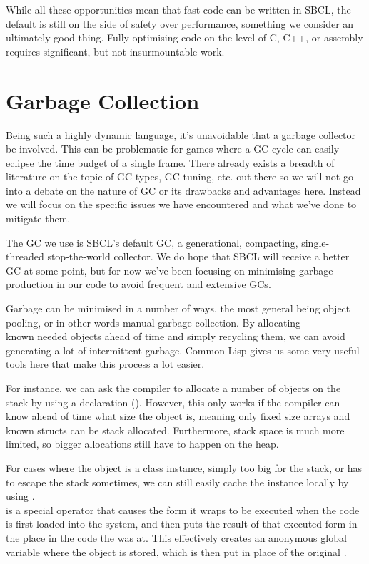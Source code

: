 \documentclass[a4paper]{paper}
\begin{document}
While all these opportunities mean that fast code can be written in SBCL, the default is still on the side of safety over performance, something we consider an ultimately good thing. Fully optimising code on the level of C, C++, or assembly requires significant, but not insurmountable work.

\section{Garbage Collection}
Being such a highly dynamic language, it's unavoidable that a garbage collector be involved. This can be problematic for games where a GC cycle can easily eclipse the time budget of a single frame. There already exists a breadth of literature on the topic of GC types, GC tuning, etc. out there so we will not go into a debate on the nature of GC or its drawbacks and advantages here. Instead we will focus on the specific issues we have encountered and what we've done to mitigate them.

The GC we use is SBCL's default GC, a generational, compacting, single-threaded stop-the-world collector. We do hope that SBCL will receive a better GC at some point, but for now we've been focusing on minimising garbage production in our code to avoid frequent and extensive GCs.

Garbage can be minimised in a number of ways, the most general being object pooling, or in other words manual garbage collection. By allocating\\known needed objects ahead of time and simply recycling them, we can avoid generating a lot of intermittent garbage. Common Lisp gives us some very useful tools here that make this process a lot easier.

For instance, we can ask the compiler to allocate a number of objects on the stack by using a declaration (). However, this only works if the compiler can know ahead of time what size the object is, meaning only fixed size arrays and known structs can be stack allocated. Furthermore, stack space is much more limited, so bigger allocations still have to happen on the heap.

For cases where the object is a class instance, simply too big for the stack, or has to escape the stack sometimes, we can still easily cache the instance locally by using .\\ is a special operator that causes the form it wraps to be executed when the code is first loaded into the system, and then puts the result of that executed form in the place in the code the  was at. This effectively creates an anonymous global variable where the object is stored, which is then put in place of the original .
\end{document}
